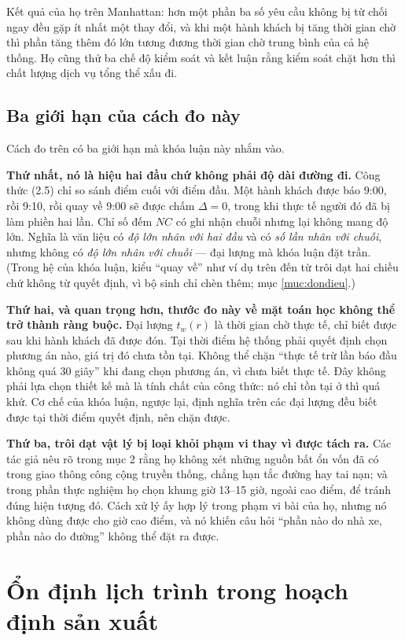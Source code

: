 Kết quả của họ trên Manhattan: hơn một phần ba số yêu cầu không bị từ chối ngay đều gặp ít nhất
một thay đổi, và khi một hành khách bị tăng thời gian chờ thì phần tăng thêm đó lớn tương đương
thời gian chờ trung bình của cả hệ thống. Họ cũng thử ba chế độ kiểm soát và kết luận rằng
kiểm soát chặt hơn thì chất lượng dịch vụ tổng thể xấu đi.

\subsection{Ba giới hạn của cách đo này}

Cách đo trên có ba giới hạn mà khóa luận này nhắm vào.

\textbf{Thứ nhất, nó là hiệu hai đầu chứ không phải độ dài đường đi.} Công thức (2.5) chỉ so
sánh điểm cuối với điểm đầu. Một hành khách được báo 9:00, rồi 9:10, rồi quay về 9:00 sẽ được
chấm $\Delta = 0$, trong khi thực tế người đó đã bị làm phiền hai lần. Chỉ số đếm $NC$ có ghi
nhận chuỗi nhưng lại không mang độ lớn. Nghĩa là văn liệu có \emph{độ lớn nhân với hai đầu} và
có \emph{số lần nhân với chuỗi}, nhưng không có \emph{độ lớn nhân với chuỗi} --- đại lượng mà khóa
luận đặt trần. (Trong hệ của khóa luận, kiểu ``quay về'' như ví dụ trên đến từ trôi dạt hai chiều
chứ không từ quyết định, vì bộ sinh chỉ chèn thêm; mục \ref{muc:dondieu}.)

\textbf{Thứ hai, và quan trọng hơn, thước đo này về mặt toán học không thể trở thành ràng
buộc.} Đại lượng $t_w(r)$ là thời gian chờ thực tế, chỉ biết được sau khi hành khách đã được
đón. Tại thời điểm hệ thống phải quyết định chọn phương án nào, giá trị đó chưa tồn tại. Không
thể chặn ``thực tế trừ lần báo đầu không quá 30 giây'' khi đang chọn phương án, vì chưa biết
thực tế. Đây không phải lựa chọn thiết kế mà là tính chất của công thức: nó chỉ tồn tại ở thì
quá khứ. Cơ chế của khóa luận, ngược lại, định nghĩa trên các đại lượng đều biết được tại thời
điểm quyết định, nên chặn được.

\textbf{Thứ ba, trôi dạt vật lý bị loại khỏi phạm vi thay vì được tách ra.} Các tác giả nêu rõ
trong mục 2 rằng họ không xét những nguồn bất ổn vốn đã có trong giao thông công cộng truyền
thống, chẳng hạn tắc đường hay tai nạn; và trong phần thực nghiệm họ chọn khung giờ 13--15 giờ,
ngoài cao điểm, để tránh đúng hiện tượng đó. Cách xử lý ấy hợp lý trong phạm vi bài của họ,
nhưng nó không dùng được cho giờ cao điểm, và nó khiến câu hỏi ``phần nào do nhà xe, phần nào
do đường'' không thể đặt ra được.

\section{Ổn định lịch trình trong hoạch định sản xuất}

